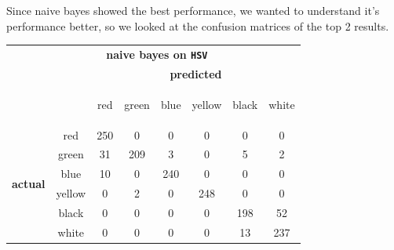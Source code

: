 \documentclass[12pt,a4paper]{article}
\begin{document}
	Since naive bayes showed the best performance, we wanted to understand it's performance better, so we looked at the confusion matrices of the top 2 results. \\

	\begin{center}
		\begin{tabular}{|c c c c c c c c|}
			\hline
			\multicolumn{1}{|c}{} & \multicolumn{6}{c}{\multirow{2}{*}{\textbf{\large naive bayes on \texttt{HSV}}}} & \multicolumn{1}{c|}{}\\
			\multicolumn{1}{|c}{} & & & & & & & \multicolumn{1}{c|}{}\\
			\hline
				& & \multicolumn{6}{|c|}{\textbf{predicted}} \\
				\multicolumn{2}{|c|}{}& \begin{sideways}red\end{sideways} & \begin{sideways}green\end{sideways} & \begin{sideways}blue\end{sideways} & \begin{sideways}yellow \end{sideways} & \begin{sideways}black\end{sideways} & \begin{sideways}white\end{sideways} \\ \hline
			\multirow{6}{*}{\begin{sideways}\textbf{actual}\end{sideways}}& \multicolumn{1}{c|}{red} &250 & 0 & 0 & 0 & 0 & 0 \\
			&\multicolumn{1}{c|}{green} & 31 & 209 & 3 & 0 & 5 & 2 \\
			&\multicolumn{1}{c|}{blue} & 10 & 0 & 240 & 0 & 0 & 0 \\
			&\multicolumn{1}{c|}{yellow} & 0 & 2 & 0 & 248 & 0 & 0 \\
			&\multicolumn{1}{c|}{black} & 0 & 0 & 0 & 0 & 198 & 52 \\
			&\multicolumn{1}{c|}{white} & 0 & 0 & 0 & 0 & 13 & 237 \\ \hline
		\end{tabular}
	\end{center}
\end{document}
